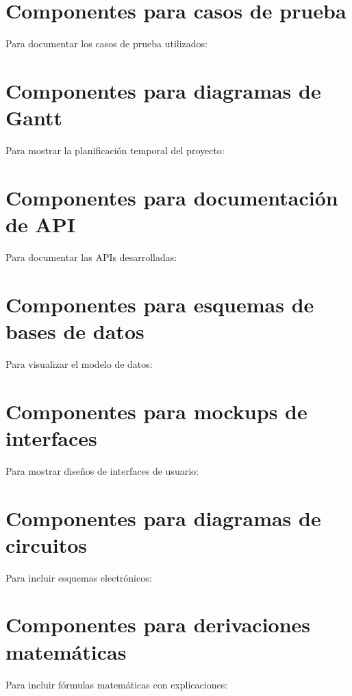 \section*{Componentes para casos de prueba}
Para documentar los casos de prueba utilizados:


\section*{Componentes para diagramas de Gantt}
Para mostrar la planificación temporal del proyecto:


\section*{Componentes para documentación de API}
Para documentar las APIs desarrolladas:


\section*{Componentes para esquemas de bases de datos}
Para visualizar el modelo de datos:


\section*{Componentes para mockups de interfaces}
Para mostrar diseños de interfaces de usuario:


\section*{Componentes para diagramas de circuitos}
Para incluir esquemas electrónicos:


\section*{Componentes para derivaciones matemáticas}
Para incluir fórmulas matemáticas con explicaciones:










